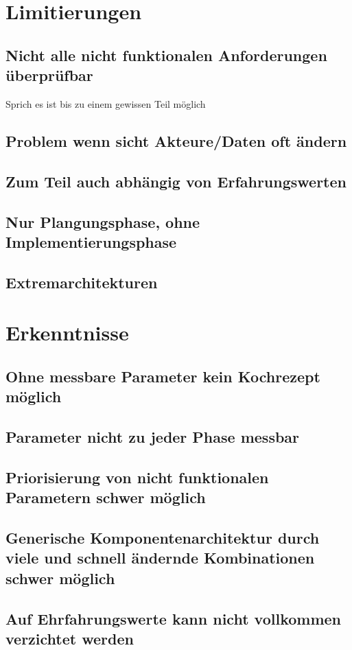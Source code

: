 \documentclass[Master,MSE,german]{twbook}
\begin{document}
\section{Limitierungen}
\subsection{Nicht alle nicht funktionalen Anforderungen überprüfbar}
Sprich es ist bis zu einem gewissen Teil möglich
\subsection{Problem wenn sicht Akteure/Daten oft ändern}
\subsection{Zum Teil auch abhängig von Erfahrungswerten}
\subsection{Nur Plangungsphase, ohne Implementierungsphase}
\subsection{Extremarchitekturen}

\section{Erkenntnisse}
\subsection{Ohne messbare Parameter kein Kochrezept möglich}
\subsection{Parameter nicht zu jeder Phase messbar}
\subsection{Priorisierung von nicht funktionalen Parametern schwer möglich}
\subsection{Generische Komponentenarchitektur durch viele und schnell ändernde Kombinationen schwer möglich}
\subsection{Auf Ehrfahrungswerte kann nicht vollkommen verzichtet werden}
\end{document}
